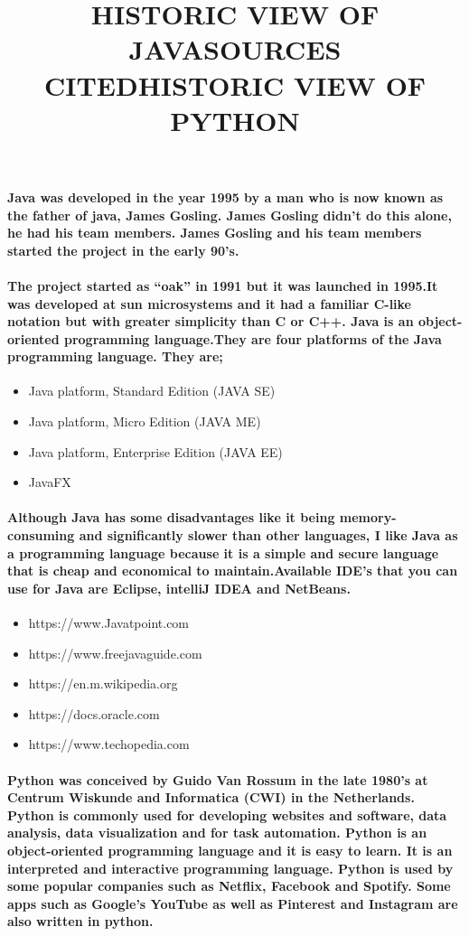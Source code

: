\documentclass{article}
\begin{document}
\title{HISTORIC VIEW OF JAVA}
		\paragraph{Java was developed in the year 1995 by a man who is now known as the father of java, James Gosling. James Gosling didn’t do this alone, he had his team members. James Gosling and his team members started the project in the early 90’s.}
		\paragraph{The project started as “oak” in 1991 but it was launched in 1995.It was developed at sun microsystems and it had a familiar C-like notation but with greater simplicity than C or C++. Java is an object-oriented programming language.They are four platforms of the Java programming language. They are;}
		
		\begin{itemize}
			\item Java platform, Standard Edition (JAVA SE)
			\item Java platform, Micro Edition (JAVA ME)
			\item Java platform, Enterprise Edition (JAVA EE)
			\item JavaFX
		\end{itemize}
	
	\paragraph{Although Java has some disadvantages like it being memory-consuming and significantly slower than other languages, I like Java as a programming language because it is a simple and secure language that is cheap and economical to maintain.Available IDE’s that you can use for Java are Eclipse, intelliJ IDEA and NetBeans.}
	
	\title{SOURCES CITED}
	\begin{itemize}
	\item https://www.Javatpoint.com
	\item https://www.freejavaguide.com
	\item https://en.m.wikipedia.org
    \item https://docs.oracle.com
    \item https://www.techopedia.com
\end{itemize}

\title{HISTORIC VIEW OF PYTHON}
\paragraph{Python was conceived by Guido Van Rossum in the late 1980’s at Centrum Wiskunde and Informatica (CWI) in the Netherlands. Python is commonly used for developing websites and software, data analysis, data visualization and for task automation. Python is an object-oriented programming language and it is easy to learn. It is an interpreted and interactive programming language. Python is used by some popular companies such as Netflix, Facebook and Spotify. Some apps such as Google’s YouTube as well as Pinterest and Instagram are also written in python.}
\end{document}
